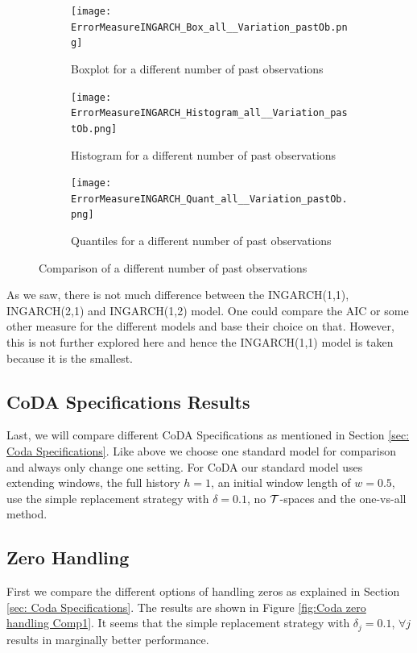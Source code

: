 \begin{figure}[htb!]
\centering
\begin{subfigure}[b]{0.45\textwidth}
\texttt{[image: ErrorMeasureINGARCH\_Box\_all\_\_Variation\_pastOb.png]}
\caption{Boxplot for a different number of past observations}
\label{fig:past obs Box}
\end{subfigure}
\hfill
\begin{subfigure}[b]{0.45\textwidth}
\texttt{[image: ErrorMeasureINGARCH\_Histogram\_all\_\_Variation\_pastOb.png]}
\caption{Histogram for a different number of past observations}
\label{fig:past obs Hist}
\end{subfigure}
\hfill
\begin{subfigure}[b]{0.8\textwidth}
\texttt{[image: ErrorMeasureINGARCH\_Quant\_all\_\_Variation\_pastOb.png]}
\caption{Quantiles for a different number of past observations}
\label{fig:past obs Quant}
\end{subfigure}
\caption{Comparison of a different number of past observations}
\label{fig:past obs Comp1}
\end{figure}

As we saw, there is not much difference between the INGARCH(1,1), INGARCH(2,1) and INGARCH(1,2) model. One could compare the AIC or some other measure for the different models and base their choice on that. However, this is not further explored here and hence the INGARCH(1,1) model is taken because it is the smallest.

\subsection{CoDA Specifications Results}
\label{sec: CoDA Specifications Results}

Last, we will compare different CoDA Specifications as mentioned in Section \ref{sec: Coda Specifications}. Like above we choose one standard model for comparison and always only change one setting. For CoDA our standard model uses extending windows, the full history $h=1$, an initial window length of $w=0.5$, use the simple replacement strategy with $\delta=0.1$, no $\mathcal{T}$-spaces and the one-vs-all method. 

\subsection{Zero Handling}
\label{sec: Zero Handling}

First we compare the different options of handling zeros as explained in Section \ref{sec: Coda Specifications}. The results are shown in Figure \ref{fig:Coda zero handling Comp1}. It seems that the simple replacement strategy with $\delta_j = 0.1$, $\forall j$ results in marginally better performance.

